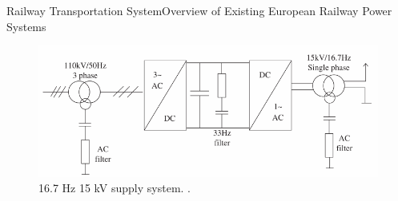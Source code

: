 \begin{frame}{Railway Transportation System}{Overview of Existing European Railway Power Systems}
\begin{minipage}[t]{0.48\linewidth}
	\begin{figure}[ht!]
	\centering
	\includegraphics[width=\textwidth,keepaspectratio]{figures/31.PowerS/abad2016e}
	\caption{16.7 Hz 15 kV supply system. \cite{abad2016}.}
\end{figure}
	
\end{minipage}

\end{frame}
